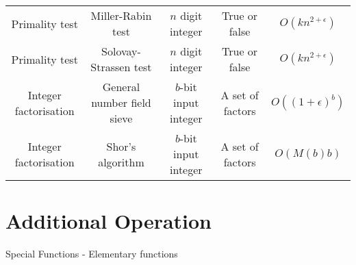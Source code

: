 \documentclass{article}
\begin{document}
\begin{table}[ht]
\begin{tabular}{c cccc}
		Primality test & Miller-Rabin test\footnotemark[5] \footnotemark[6] & $n$ digit integer & True or false & $O(kn^{2+\epsilon})$ \\
		Primality test & Solovay-Strassen test\footnotemark[5] \footnotemark[6] & $n$ digit integer & True or false & $O(kn^{2+\epsilon})$ \\
		Integer factorisation & General number field sieve\footnotemark[5] & $b$-bit input integer & A set of factors & $O((1+\epsilon)^b)$ \\
		Integer factorisation & Shor's algorithm \footnotemark[4] \footnotemark[7] & $b$-bit input integer & A set of factors & $O(M(b)b)$ \\
		\hline
	\end{tabular}
\end{table}


\newpage
\section*{Additional Operation}

Special Functions - Elementary functions
\end{document}
